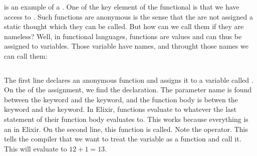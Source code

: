  is an example of a . One of the key element of the functional  is that we have access to . Such functions are anonymous is the sense that the are not assigned a static  thought which they can be called. But how can we call them if they are nameless? Well, in functional languages, functions are values and can thus be assigned to variables. Those variable have names, and throught those names we can call them:

\inputminted[firstline=3]{elixir}{../src/elixir/functions/anon/anon.exs} %

The first line declares an anonymous function and assigns it to a variable called . On the  of the assignment, we find the declaration. The parameter name is found between the  keyword and the \keywordname{->} keyword, and the function body is betwen the \keywordname{->} keyword and the  keyword. In Elixir, functions evaluate to whatever the last statement of their function body evaluates to. This works because everything is an  in Elixir. On the second line, this function is called. Note the  operator. This tells the compiler that we want to treat the variable as a function and call it. This will evaluate to $12+1=13$.

